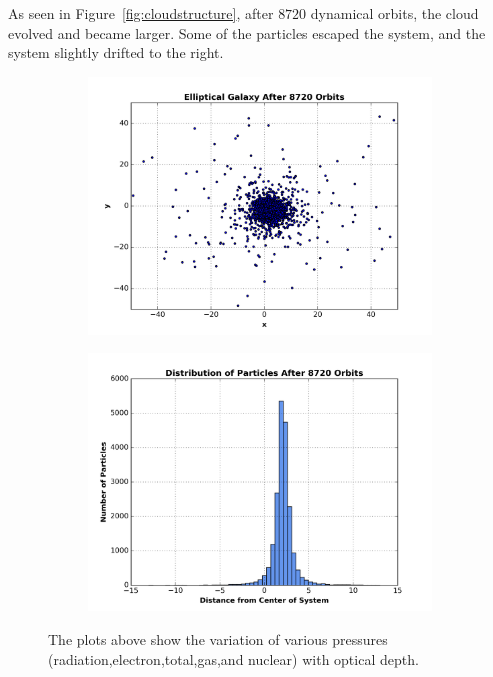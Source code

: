 \documentclass[12pt]{report}
\begin{document}
As seen in Figure~\ref{fig:cloudstructure}, after $8720$ dynamical orbits, the cloud evolved and became larger. Some of the particles escaped the system, and the system slightly drifted to the right.


\begin{figure}[H]
\centering 
    \begin{subfigure}[b]{.475\textwidth}
        \centering
        \includegraphics[width=\linewidth]{final_structure_of_cloud.png}
        \caption[]%
        {{}}
        \label{fig:pressurecomparisionfigure}
    \end{subfigure} %
    \hfill
    \begin{subfigure}[b]{.475\textwidth}
        \centering
        \includegraphics[width=\linewidth]{histogram_final_distributionofparticlesfromcenter.png}
        \caption[]%
        {{}}
        \label{fig:beta}
    \end{subfigure} %
    \caption[]
        {The plots above show the variation of various pressures (radiation,electron,total,gas,and nuclear) with optical depth.} 
        \label{fig:pressurefigure}
\end{figure}
\end{document}
